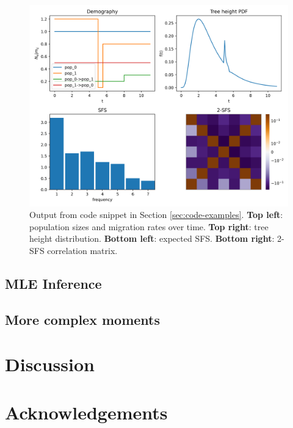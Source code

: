 \documentclass[hidelinks,11pt]{article}
\begin{document}
    \begin{figure}[H]
        \centering
        \includegraphics[width=\textwidth]{figures/manuscript_example}
        \caption{
            Output from code snippet in Section \ref{sec:code-examples}.
            \textbf{Top left}: population sizes and migration rates over time.
            \textbf{Top right}: tree height distribution. \textbf{Bottom left}: expected SFS.
            \textbf{Bottom right}: 2-SFS correlation matrix.
        }
        \label{fig:simple-example}
    \end{figure}

    \subsection{MLE Inference}\label{subsec:mle-inference}

    \subsection{More complex moments}\label{subsec:other-quantities}


    \section{Discussion}\label{sec:discussion}

    \section*{Acknowledgements}

    \newpage
    

    \newpage
    \appendix
    
\end{document}
